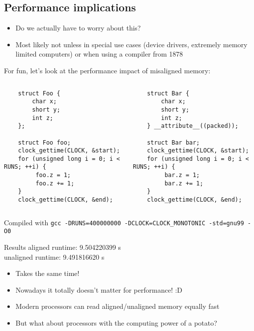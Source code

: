 \documentclass{beamer}
\begin{document}
\subsection{Performance implications}
\begin{frame}{\insertsection}{\insertsubsection}
	\begin{itemize}
        \item Do we actually have to worry about this?\pause
        \item Most likely not unless in special use cases (device drivers, extremely memory
            limited computers) or when using a compiler from 1878
	\end{itemize}
\end{frame}

\begin{frame}[fragile]{\insertsection}{\insertsubsection}
    For fun, let's look at the performance impact of misaligned memory:
    \begin{columns}[]
            \begin{verbatim}
    struct Foo {
        char x;
        short y;
        int z;
    };

    struct Foo foo;
    clock_gettime(CLOCK, &start);
    for (unsigned long i = 0; i < RUNS; ++i) {
         foo.z = 1;
         foo.z += 1;
    }
    clock_gettime(CLOCK, &end);
            \end{verbatim}

            \begin{verbatim}
    struct Bar {
        char x;
        short y;
        int z;
    } __attribute__((packed));

    struct Bar bar;
    clock_gettime(CLOCK, &start);
    for (unsigned long i = 0; i < RUNS; ++i) {
         bar.z = 1;
         bar.z += 1;
    }
    clock_gettime(CLOCK, &end);
            \end{verbatim}
    \end{columns}
    \begin{block}{Compiled with}
        \small \verb|gcc -DRUNS=400000000 -DCLOCK=CLOCK_MONOTONIC -std=gnu99 -O0|
    \end{block}
\end{frame}

\begin{frame}{\insertsection}{\insertsubsection}
    \begin{block}{Results}
        aligned runtime: 9.504220399 s\\
        unaligned runtime: 9.491816620 s
    \end{block}
    \pause
    \begin{itemize}
        \item Takes the same time!
	    \item Nowadays it totally doesn't matter for performance! :D
        \item Modern processors can read aligned/unaligned memory equally fast\pause
        \item But what about processors with the computing power of a potato?
	\end{itemize}
\end{frame}
\end{document}
